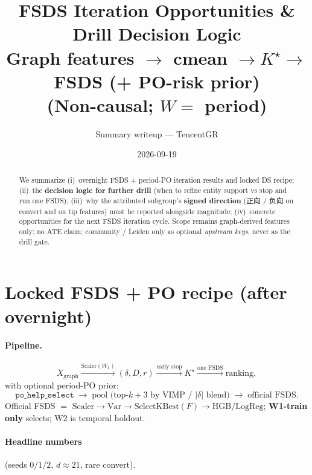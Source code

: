 \documentclass[11pt]{article}
\title{\textbf{FSDS Iteration Opportunities \& Drill Decision Logic}\\
\large Graph features $\to$ cmean $\to K^\star\to$ FSDS (+ PO-risk prior)\\
\large (Non-causal; $W=$ period)}
\author{Summary writeup --- TencentGR}
\date{2026-09-19}
\begin{document}
\maketitle

\begin{abstract}
We summarize (i)~overnight FSDS + period-PO iteration results and
locked DS recipe; (ii)~the \textbf{decision logic for further drill}
(when to refine entity support vs stop and run one FSDS);
(iii)~why the attributed subgroup's \textbf{signed direction}
(正向 / 负向 on convert and on tip features) must be reported
alongside magnitude; (iv)~concrete opportunities for the next
FSDS iteration cycle.
Scope remains graph-derived features only; no ATE claim;
community / Leiden only as optional \emph{upstream keys}, never as
the drill gate.
\end{abstract}

\tableofcontents
\vspace{0.8em}

\section{Locked FSDS + PO recipe (after overnight)}
\label{sec:locked}

\paragraph{Pipeline.}
\[
  X_{\text{graph}}
  \xrightarrow{\mathrm{Scaler}(W_1)}
  (\delta,D,r)
  \xrightarrow{\text{early stop}}
  K^\star
  \xrightarrow{\text{one FSDS}}
  \text{ranking},
\]
with optional period-PO prior:
\[
  \texttt{po\_help\_select}
  \;\to\;
  \text{pool (top-$k{+}3$ by VIMP / $|\delta|$ blend)}
  \;\to\;
  \text{official FSDS}.
\]
Official FSDS $=$
$\mathrm{Scaler}\to\mathrm{Var}\to\mathrm{SelectKBest}(F)
\to\mathrm{HGB}/\mathrm{LogReg}$;
\textbf{W1-train only} selects; W2 is temporal holdout.

\paragraph{Headline numbers} (seeds $0/1/2$, $d\approx 21$, rare convert).
\end{document}

